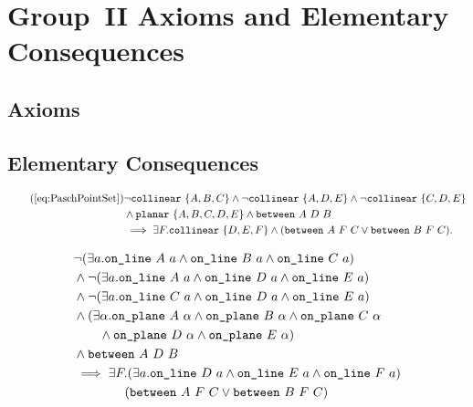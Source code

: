 \chapter{Group~II Axioms and Elementary Consequences}\label{app:Group2}

\section{Axioms}

\section{Elementary Consequences}
\begin{align}
  \tag{\ref{eq:PaschPointSet}}
  &\neg\code{collinear}\ \{A,B,C\}\wedge\neg\code{collinear}\ \{A,D,E\}\wedge\neg\code{collinear}\ \{C,D,E\}\\
  &\wedge\code{planar}\ \{A,B,C,D,E\}\wedge\between{A}{D}{B}\\
  &\implies\exists F. \code{collinear}\ \{D,E,F\} \wedge (\between{A}{F}{C}\vee\between{B}{F}{C}).
\end{align} 

\begin{equation}\label{eq:PaschPointSetUnfold}
  \begin{split}
    &\neg(\exists a.\texttt{on\_line}\ A\ a\wedge \texttt{on\_line}\ B\ a\wedge \texttt{on\_line}\ C\ a)\\
    &\wedge\neg(\exists a.\texttt{on\_line}\ A\ a\wedge \texttt{on\_line}\ D\ a\wedge \texttt{on\_line}\ E\ a)\\
    &\wedge\neg(\exists a.\texttt{on\_line}\ C\ a\wedge \texttt{on\_line}\ D\ a\wedge \texttt{on\_line}\ E\ a)\\
    &\wedge(\exists\alpha. \texttt{on\_plane}\ A\ \alpha\wedge \texttt{on\_plane}\ B\ \alpha\wedge \texttt{on\_plane}\ C\ \alpha\\
    &\qquad\wedge \texttt{on\_plane}\ D\ \alpha\wedge \texttt{on\_plane}\ E\ \alpha)\\
    &\wedge\texttt{between}\ A\ D\ B\\
    &\implies\exists F. (\exists a. \texttt{on\_line}\ D\ a\wedge \texttt{on\_line}\ E\ a\wedge \texttt{on\_line}\ F\ a)\\
    &\qquad\qquad (\texttt{between}\ A\ F\ C\vee\texttt{between}\ B\ F\ C)
  \end{split}
\end{equation}

